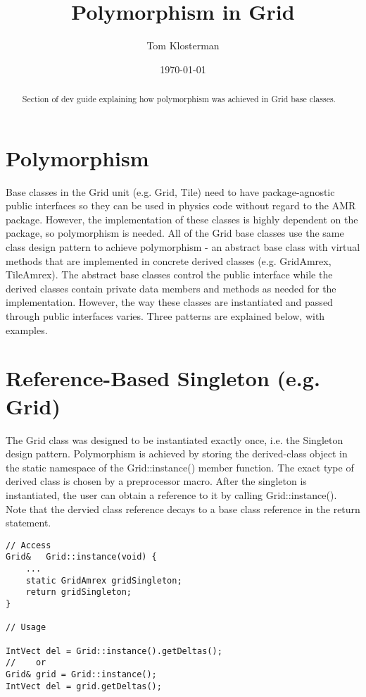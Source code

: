 \documentclass[letterpaper,12pt]{article}
\begin{document}
\title{Polymorphism in Grid}
\author{Tom Klosterman}
\date{\today}
\maketitle

\begin{abstract}
Section of dev guide explaining how polymorphism was achieved in Grid base classes.
\end{abstract}


\section{Polymorphism}

Base classes in the Grid unit (e.g. Grid, Tile) need to have package-agnostic public interfaces so they can be used in physics code without regard to the AMR package. However, the implementation of these classes is highly dependent on the package, so polymorphism is needed. All of the Grid base classes use the same class design pattern to achieve polymorphism - an abstract base class with virtual methods that are implemented in concrete derived classes (e.g. GridAmrex, TileAmrex). The abstract base classes control the public interface while the derived classes contain private data members and methods as needed for the implementation. However, the way these classes are instantiated and passed through public interfaces varies. Three patterns are explained below, with examples.


\section{Reference-Based Singleton (e.g. Grid)}
The Grid class was designed to be instantiated exactly once, i.e. the Singleton design pattern. Polymorphism is achieved by storing the derived-class object in the static namespace of the Grid::instance() member function. The exact type of derived class is chosen by a preprocessor macro. After the singleton is instantiated, the user can obtain a reference to it by calling Grid::instance(). Note that the dervied class reference decays to a base class reference in the return statement.

\begin{verbatim}
// Access
Grid&   Grid::instance(void) {
    ...
    static GridAmrex gridSingleton;
    return gridSingleton;
}

// Usage

IntVect del = Grid::instance().getDeltas();
//    or
Grid& grid = Grid::instance();
IntVect del = grid.getDeltas();
\end{verbatim}
\end{document}
